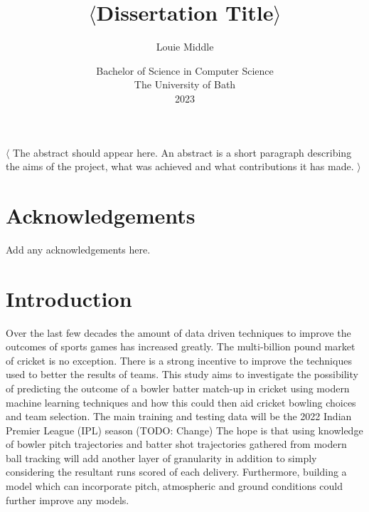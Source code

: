 \documentclass[12pt,a4paper]{report}
\title{\bf $\langle$Dissertation Title$\rangle$}
\author{Louie Middle}
\date{Bachelor of Science in Computer Science\\ 
      The University of Bath\\
      2023}
\begin{document}
\hypersetup{pageanchor=false}

\lstset{language=Java,breaklines,breakatwhitespace,basicstyle=\small}

\setcounter{page}{0}

\maketitle
\newpage

\newpage

\newpage

\hypersetup{pageanchor=true}

\abstract
$\langle$
The abstract should appear here. 
An abstract is a short paragraph describing the aims of the project, what was achieved and what contributions it has made.
$\rangle$
\newpage

\tableofcontents
\newpage

\listoffigures
\newpage

\listoftables
\newpage

\chapter*{Acknowledgements}

Add any acknowledgements here.

\newpage
\setcounter{page}{1}

\chapter{Introduction}

Over the last few decades the amount of data driven techniques to improve the outcomes of sports games has increased greatly. 
The multi-billion pound market of cricket is no exception. 
There is a strong incentive to improve the techniques used to better the results of teams. 
This study aims to investigate the possibility of predicting the outcome of a bowler batter match-up in cricket using modern machine learning techniques and how this could then aid cricket bowling choices and team selection. 
The main training and testing data will be the 2022 Indian Premier League (IPL) season (TODO: Change)
The hope is that using knowledge of bowler pitch trajectories and batter shot trajectories gathered from modern ball tracking will add another layer of granularity in addition to simply considering the resultant runs scored of each delivery. 
Furthermore, building a model which can incorporate pitch, atmospheric and ground conditions could further improve any models. 
\end{document}
